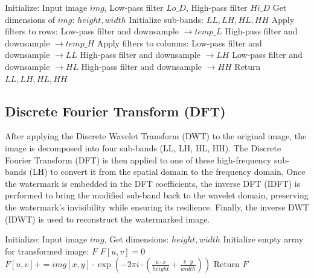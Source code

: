 \begin{algorithm}
\caption{Discrete Wavelet Transform (DWT)}
\begin{algorithmic}[1]
\State Initialize: Input image $img$, Low-pass filter $Lo\_D$, High-pass filter $Hi\_D$
\State Get dimensions of $img$: $height, width$
\State Initialize sub-bands: $LL, LH, HL, HH$
\State Apply filters to rows:
\State Low-pass filter and downsample $\rightarrow temp\_L$
\State High-pass filter and downsample $\rightarrow temp\_H$
\EndFor
\State Apply filters to columns:
\State Low-pass filter and downsample $\rightarrow LL$
\State High-pass filter and downsample $\rightarrow LH$
\EndFor
{}
\State Low-pass filter and downsample $\rightarrow HL$
\State High-pass filter and downsample $\rightarrow HH$
\EndFor
\State Return $LL, LH, HL, HH$
\EndFunction
\end{algorithmic}
\end{algorithm}

\subsection{Discrete Fourier Transform (DFT)}

After applying the Discrete Wavelet Transform (DWT) to the original image, the image is decomposed into four sub-bands (LL, LH, HL, HH). The Discrete Fourier Transform (DFT) is then applied to one of these high-frequency sub-bands (LH) to convert it from the spatial domain to the frequency domain. Once the watermark is embedded in the DFT coefficients, the inverse DFT (IDFT) is performed to bring the modified sub-band back to the wavelet domain, preserving the watermark's invisibility while ensuring its resilience. Finally, the inverse DWT (IDWT) is used to reconstruct the watermarked image.

\begin{algorithm}
\caption{Discrete Fourier Transform (DFT)}
\begin{algorithmic}[1]
\State Initialize: Input image $img$, Get dimensions: $height, width$
\State Initialize empty array for transformed image: $F$
\State $F[u, v] = 0$
\State $F[u, v] += img[x, y] \cdot \exp\left(-2\pi i \cdot \left(\frac{u \cdot x}{height} + \frac{v \cdot y}{width}\right)\right)$
\EndFor
\EndFor
\State Return $F$
\EndFunction
\end{algorithmic}
\end{algorithm}

